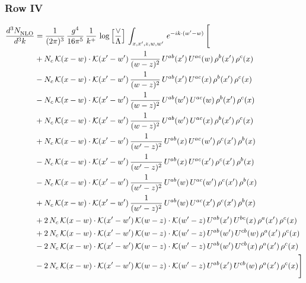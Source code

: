 \documentclass[9pt]{article}
\numberwithin{equation}{section}
\begin{document}
\subsubsection{Row IV}
\begin{align}
    \frac{d^{3}N_{\rm NLO}^{\rm}}{d^{3}k}  & = \frac{1}{(2\pi)^{3}}\,\frac{g^{4}}{16\pi^{5}}\,\frac{1}{k^{+}}\,\log{\left[\frac{\vee}{\Lambda}\right]}\,\int_{x,x',z,w,w'}\,e^{-ik\cdot(w'-w)}\,\Bigg[\notag \\ & +N_{c}\,\mathcal{K}(x-w)\cdot\mathcal{K}(x'-w')\,\frac{1}{(w-z)^{2}}\,U^{ab}(x')\,U^{ac}(w)\,\rho^{b}(x')\,\rho^{c}(x)\notag\\
&-N_{c}\,\mathcal{K}(x-w)\cdot\mathcal{K}(x'-w')\,\frac{1}{(w-z)^{2}}\,U^{ab}(x')\,U^{ac}(x)\,\rho^{b}(x')\,\rho^{c}(x)\notag\\
&-N_{c}\,\mathcal{K}(x-w)\cdot\mathcal{K}(x'-w')\,\frac{1}{(w-z)^{2}}\,U^{ab}(w')\,U^{ac}(w)\,\rho^{b}(x')\,\rho^{c}(x)\notag\\
&+N_{c}\,\mathcal{K}(x-w)\cdot\mathcal{K}(x'-w')\,\frac{1}{(w-z)^{2}}\,U^{ab}(w')\,U^{ac}(x)\,\rho^{b}(x')\,\rho^{c}(x)\notag\\
&+N_{c}\,\mathcal{K}(x-w)\cdot\mathcal{K}(x'-w')\,\frac{1}{(w'-z)^{2}}\,U^{ab}(x)\,U^{ac}(w')\,\rho^{c}(x')\,\rho^{b}(x)\notag\\
&-N_{c}\,\mathcal{K}(x-w)\cdot\mathcal{K}(x'-w')\,\frac{1}{(w'-z)^{2}}\,U^{ab}(x)\,U^{ac}(x')\,\rho^{c}(x')\,\rho^{b}(x)\notag\\
&-N_{c}\,\mathcal{K}(x-w)\cdot\mathcal{K}(x'-w')\,\frac{1}{(w'-z)^{2}}\,U^{ab}(w)\,U^{ac}(w')\,\rho^{c}(x')\,\rho^{b}(x)\notag\\
&+N_{c}\,\mathcal{K}(x-w)\cdot\mathcal{K}(x'-w')\,\frac{1}{(w'-z)^{2}}\,U^{ab}(w)\,U^{ac}(x')\,\rho^{c}(x')\,\rho^{b}(x)\notag\\
&+2\,N_{c}\,\mathcal{K}(x-w)\cdot\mathcal{K}(x'-w')\,\mathcal{K}(w-z)\cdot\mathcal{K}(w'-z)\,U^{ab}(x')\,U^{bc}(x)\,\rho^{a}(x')\,\rho^{c}(x)\notag\\
&+2\,N_{c}\,\mathcal{K}(x-w)\cdot\mathcal{K}(x'-w')\,\mathcal{K}(w-z)\cdot\mathcal{K}(w'-z)\,U^{ab}(w')\,U^{cb}(w)\,\rho^{a}(x')\,\rho^{c}(x)\notag\\
&-2\,N_{c}\,\mathcal{K}(x-w)\cdot\mathcal{K}(x'-w')\,\mathcal{K}(w-z)\cdot\mathcal{K}(w'-z)\,U^{ab}(w')\,U^{cb}(x)\,\rho^{a}(x')\,\rho^{c}(x)\notag\\
&-2\,N_{c}\,\mathcal{K}(x-w)\cdot\mathcal{K}(x'-w')\,\mathcal{K}(w-z)\cdot\mathcal{K}(w'-z)\,U^{ab}(x')\,U^{cb}(w)\,\rho^{a}(x')\,\rho^{c}(x)\Bigg]
\end{align}
\end{document}
